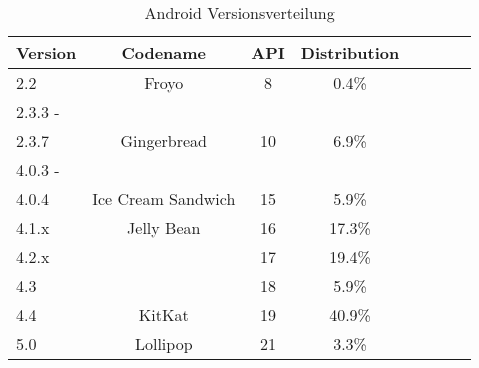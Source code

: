 \label{Kapitel2}

\begin{table}
	\centering
	\begin{tabular}{l*{6}{c}r}
		\textbf{Version} & \textbf{Codename} & \textbf{API} & \textbf{Distribution} \\
		\hline
		2.2 & Froyo & 8 & 0.4\% \\
		2.3.3 - \\
		2.3.7 & Gingerbread & 10 & 6.9\% \\
		4.0.3 - \\
		4.0.4 & Ice Cream Sandwich & 15 & 5.9\% \\
		4.1.x & Jelly Bean & 16 & 17.3\% \\
		4.2.x &  & 17 & 19.4\% \\
		4.3 &  & 18 & 5.9\% \\
		4.4 & KitKat & 19 & 40.9\% \\
		5.0 & Lollipop & 21 & 3.3\%
	\end{tabular}
	\caption{Android Versionsverteilung}
	\label{android-versionsverteilung}
\end{table}